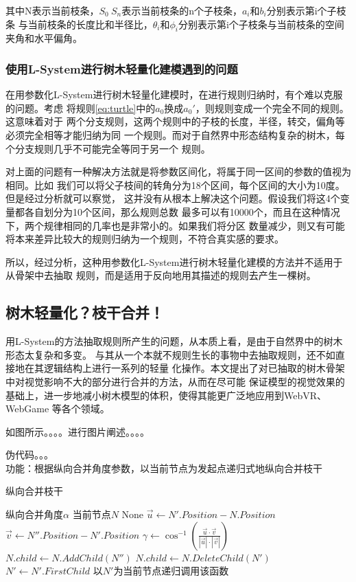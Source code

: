 其中N表示当前枝条，$S_0~S_n$表示当前枝条的n个子枝条，$a_i和b_i$分别表示第i个子枝条
与当前枝条的长度比和半径比，$\theta_i和\phi_i$分别表示第i个子枝条与当前枝条的空间
夹角和水平偏角。

\subsubsection{使用L-System进行树木轻量化建模遇到的问题}
在用参数化L-System进行树木轻量化建模时，在进行规则归纳时，有个难以克服的问题。考虑
将规则\ref{eq:turtle}中的$a_0$换成$a_0'$，则规则变成一个完全不同的规则。这意味着对于
两个分支规则，这两个规则中的子枝的长度，半径，转交，偏角等必须完全相等才能归纳为同
一个规则。而对于自然界中形态结构复杂的树木，每个分支规则几乎不可能完全等同于另一个
规则。

对上面的问题有一种解决方法就是将参数区间化，将属于同一区间的参数的值视为相同。比如
我们可以将父子枝间的转角分为18个区间，每个区间的大小为10度。但是经过分析就可以察觉，
这并没有从根本上解决这个问题。假设我们将这4个变量都各自划分为10个区间，那么规则总数
最多可以有10000个，而且在这种情况下，两个规律相同的几率也是非常小的。如果我们将分区
数量减少，则又有可能将本来差异比较大的规则归纳为一个规则，不符合真实感的要求。

所以，经过分析，这种用参数化L-System进行树木轻量化建模的方法并不适用于从骨架中去抽取
规则，而是适用于反向地用其描述的规则去产生一棵树。

\subsection{树木轻量化？枝干合并！}
\label{subsec:branchmerge}
用L-System的方法抽取规则所产生的问题，从本质上看，是由于自然界中的树木形态太复杂和多变。
与其从一个本就不规则生长的事物中去抽取规则，还不如直接地在其逻辑结构上进行一系列的轻量
化操作。本文提出了对已抽取的树木骨架中对视觉影响不大的部分进行合并的方法，从而在尽可能
保证模型的视觉效果的基础上，进一步地减小树木模型的体积，使得其能更广泛地应用到WebVR、WebGame
等各个领域。

如图所示。。。。进行图片阐述。。。。

伪代码。。。\\
功能：根据纵向合并角度参数，以当前节点为发起点递归式地纵向合并枝干\\
\begin{algorithm}
	\caption{纵向合并枝干}
	\begin{algorithmic}[1]
		\Require 纵向合并角度$\alpha$
		\Require 当前节点$N$
		\Ensure None
		\State $\vec{u} \gets N'.Position-N.Position$
		\State $\vec{v} \gets N''.Position-N'.Position$
		\State $\gamma \gets \cos^{-1}({\frac{\vec{u} \cdot \vec{v}}{|\vec{u}|\cdot|\vec{v}|}})$
		\If{$\gamma<\alpha$}
		\State $N.child \gets N.AddChild(N'')$
		\State $N.child \gets N.DeleteChild(N') $
		\EndIf
		\State $N' \gets N'.FirstChild$
		\EndWhile
		\EndFor
		\State 以$N'$为当前节点递归调用该函数
		\EndFor
		\EndIf
	\end{algorithmic}
\end{algorithm}

